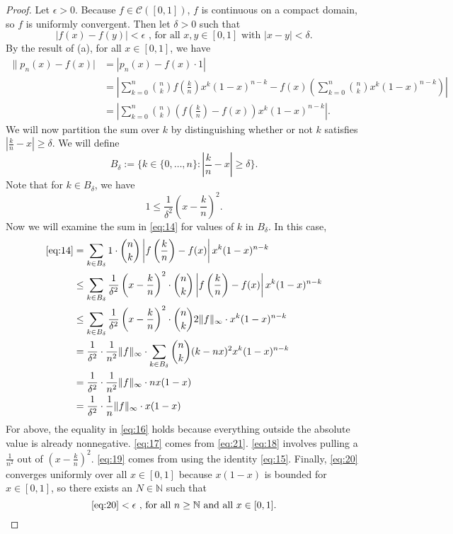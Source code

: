\documentclass[12pt]{amsart}
\newcommand{\N}{\mathbb{N}}
\newcommand{\eq}[1]{\begin{equation*}#1\end{equation*}}
\newcommand{\qeq}[1]{\begin{equation}#1\end{equation}}
\newcommand{\qal}[1]{\begin{align}#1\end{align}}
\newcommand{\<}{\langle}
\renewcommand{\>}{\rangle}
\renewcommand{\-}[1]{\overline{#1}}
\begin{document}
\begin{itemize}
    \begin{proof}
        Let $\epsilon > 0$. Because $f \in \mathcal{C}([0,1])$, $f$ is continuous on a compact domain, so $f$ is uniformly convergent. Then let $\delta > 0$ such that 
        \qeq{|f(x) - f(y)| < \epsilon \text{ , for all } x, y \in [0,1] \text{ with } |x-y| < \delta. \label{eq:22}}
        By the result of (a), for all $x \in [0,1]$, we have 
        \qal{\|p_n(x) - f(x)| &= |p_n(x) - f(x) \cdot 1| \nonumber\\
            &= \left|\sum_{k=0}^n \binom{n}{k}f\left(\frac{k}{n}\right) x^k(1-x)^{n-k} - f(x) \left(\sum_{k = 0}^n \binom{n}{k} x^k (1-x)^{n-k}\right)\right| \nonumber\\
            &= \left| \sum_{k=0}^{n} \binom{n}{k} \left(f\left(\frac{k}{n}\right) - f(x)\right) x^k(1-x)^{n-k}\right| \label{eq:14}.}
        We will now partition the sum over $k$ by distinguishing whether or not $k$ satisfies $|\frac{k}{n} - x | \geq \delta$. We will define
        \eq{B_\delta := \{k \in \{0, \dots, n\} : |\frac{k}{n} - x| \geq \delta\}.}
        Note that for $k \in B_\delta$, we have 
        \qeq{1 \leq \frac{1}{\delta^2} \left(x - \frac{k}{n}\right)^2. \label{eq:21}}
        Now we will examine the sum in \eqref{eq:14} for values of $k$ in $B_\delta$. In this case,
        \qal{ \eqref{eq:14} &= \sum_{k \in B_\delta} 1 \cdot \binom{n}{k} \left|f\left(\frac{k}{n}\right)- f(x)\right|x^k(1-x)^{n-k} \label{eq:16}\\
        &\leq \sum_{k \in B_\delta} \frac{1}{\delta^2} \left(x - \frac{k}{n}\right)^2 \cdot \binom{n}{k} \left|f\left(\frac{k}{n}\right)- f(x)\right|x^k(1-x)^{n-k} \label{eq:17}\\
        &\leq \sum_{k \in B_\delta} \frac{1}{\delta^2} \left(x - \frac{k}{n}\right)^2 \cdot \binom{n}{k} 2\|f\|_\infty \cdot x^k(1-x)^{n-k} \nonumber\\
        &= \frac{1}{\delta^2} \cdot \frac{1}{n^2}\|f\|_\infty \cdot \sum_{k \in B_\delta} \binom{n}{k} (k-nx)^2 x^k(1-x)^{n-k} \label{eq:18}\\
        &= \frac{1}{\delta^2} \cdot \frac{1}{n^2}\|f\|_\infty \cdot nx(1-x) \label{eq:19}\\
        &= \frac{1}{\delta^2} \cdot \frac{1}{n} \|f\|_\infty \cdot x(1-x) \label{eq:20}}
        For above, the equality in \eqref{eq:16} holds because everything outside the absolute value is already nonnegative. \eqref{eq:17} comes from \eqref{eq:21}. \eqref{eq:18} involves pulling a $\frac{1}{n^2}$ out of $\left(x - \frac{k}{n}\right)^2$. \eqref{eq:19} comes from using the identity \eqref{eq:15}. Finally, \eqref{eq:20} converges uniformly over all $x \in [0,1]$ because $x(1-x)$ is bounded for $x \in [0,1]$, so there exists an $N \in \N$ such that \eq{\eqref{eq:20} < \epsilon \text{ , for all } n \geq \N \text{ and all } x \in [0,1].}


\end{proof}
\end{itemize}
\end{document}

